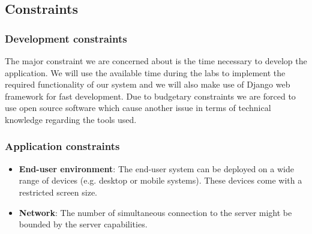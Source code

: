 \documentclass{sig-alt-release2}
\begin{document}
\subsection{Constraints}

\subsubsection{Development constraints}

The major constraint we are concerned about is the time necessary to develop 
the application. We will use the available time during the labs to implement 
the required functionality of our system and we will also make use of Django 
web framework for fast development. Due to budgetary constraints we are forced 
to use open source software which cause another issue in terms of technical 
knowledge regarding the tools used.

\subsubsection{Application constraints}
\begin{itemize} \itemsep1pt \parskip0pt 
	\item \textbf{End-user environment}: The end-user system can be deployed
	on a wide range of devices (e.g. desktop or mobile systems). These devices
	come with a restricted screen size.
	\item \textbf{Network}: The number of simultaneous connection to the server
	might be bounded by the server capabilities.
\end{itemize}
\end{document}
